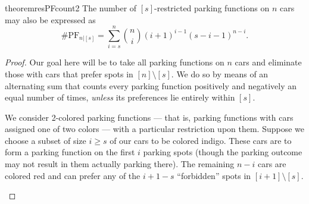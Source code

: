 \documentclass[12pt]{article}
\newcommand{\mzncarrot}[4][(0,0)]{
    \begin{scope}[shift={#1}]
    \shade[top color=#2, bottom color=#2, shading angle=90, draw=#2!90!black, rounded corners=0.5ex, thick] (0.5,0.25) -- ++(0,1.5+.25) -- ++(0.5,0.25) -- ++(1.5,0) -- ++(1,-.5) -- ++(0,-1.45) -- cycle;
    \draw[thick, rounded corners=0.2ex, fill=white, thick] (1,2.1) -- ++(0.5,0.45) -- ++(0.8,0) -- ++(0.3,-0.45) -- cycle;
    \draw[thick] (2.1-.25,2.1) -- ++(0,.45);
    \if\relax\detokenize{#3}\relax 
    \else
    \draw[fill=#2!20, thin, draw = #2] (2.1-.25,1.3) circle[radius=.65] 
        node [anchor = center, rotate = #4]{\small #3};
    \fi
    \draw[fill=gray!80,thin] (1.375-.25,.25) circle[radius=.2];
    \draw[fill=gray!80,thin] (2.76-.25,.25) circle[radius=.2];
    \end{scope}
}
\newcommand{\mzncar}[3][(0,0)]{
    \mzncarrot[#1]{#2}{#3}{0}
}
\begin{document}
\begin{restatable}{theorem}{resPFcount2}
    \label{thm:resPFcount2}
    The number of $[s]$-restricted parking functions on $n$ cars may also be expressed as
    \[\#\mathrm{PF}_{n|[s]}=\sum_{i = s}^{n} \binom{n}{i} (i + 1)^{i - 1} (s - i - 1)^{n - i}.\]
\end{restatable}

\begin{proof}
    Our goal here will be to take all parking functions on $n$ cars and eliminate those with cars that prefer spots in $[n] \setminus [s]$. We do so by means of an alternating sum that counts every parking function positively and negatively an equal number of times, \textit{unless} its preferences lie entirely within $[s].$

	We consider 2-colored parking functions --- that is, parking functions with cars assigned one of two colors --- with a particular restriction upon them.  Suppose we choose a subset of size $i \ge s$ of our cars to be colored indigo. These cars are to form a parking function on the first $i$ parking spots (though the parking outcome may not result in them actually parking there). The remaining $n - i$ cars are colored red and can prefer any of the $i + 1 - s$ ``forbidden'' spots in  $[i + 1] \setminus [s]$.
    

\begin{figure}[h]
\begin{center}
\end{center}
\end{figure}
\end{proof}
\end{document}
